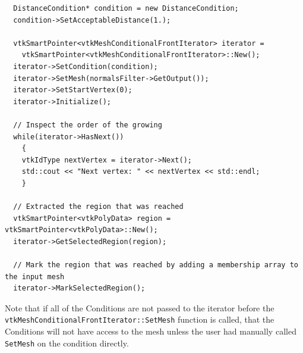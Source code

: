 \documentclass{InsightArticle}
\begin{document}
\begin{verbatim}
  DistanceCondition* condition = new DistanceCondition;
  condition->SetAcceptableDistance(1.);
    
  vtkSmartPointer<vtkMeshConditionalFrontIterator> iterator = 
    vtkSmartPointer<vtkMeshConditionalFrontIterator>::New();
  iterator->SetCondition(condition);
  iterator->SetMesh(normalsFilter->GetOutput());
  iterator->SetStartVertex(0);
  iterator->Initialize();

  // Inspect the order of the growing
  while(iterator->HasNext())
    {
    vtkIdType nextVertex = iterator->Next();
    std::cout << "Next vertex: " << nextVertex << std::endl;
    }

  // Extracted the region that was reached
  vtkSmartPointer<vtkPolyData> region = vtkSmartPointer<vtkPolyData>::New();
  iterator->GetSelectedRegion(region);

  // Mark the region that was reached by adding a membership array to the input mesh
  iterator->MarkSelectedRegion();

\end{verbatim}

Note that if all of the Conditions are not passed to the iterator before the \verb|vtkMeshConditionalFrontIterator::SetMesh| function is called, that the Conditions will not have access to the mesh unless the user had manually called \verb|SetMesh| on the condition directly.
\end{document}
